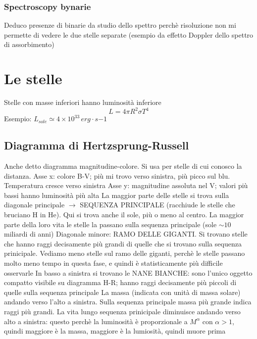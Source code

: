 \documentclass[a4paper,11pt]{report}
\theoremstyle{remark}
\theoremstyle{definition}
\begin{document}
\subsection*{Spectroscopy bynarie}
Deduco presenze di binarie da studio dello spettro perchè risoluzione non mi permette di vedere le due stelle separate (esempio da effetto Doppler dello spettro di assorbimento)

\chapter{Le stelle}
Stelle con masse inferiori hanno luminosità inferiore
\begin{equation*}
    L = 4 \pi R^2 \sigma T^4 
\end{equation*}
Esempio: $L_{sole} \simeq 4 \times 10^33 \, erg \cdot s{-1}$

\section{Diagramma di Hertzsprung-Russell}

Anche detto diagramma magnitudine-colore. Si usa per stelle di cui conosco la distanza. \newline
Asse x: colore B-V; più mi trovo verso sinistra, più picco sul blu. Temperatura cresce verso sinistra \newline
Asse y: magnitudine assoluta nel V; valori più bassi hanno luminosità più alta \newline
La maggior parte delle stelle si trova sulla diagonale principale $\rightarrow$ SEQUENZA PRINCIPALE (racchiude le stelle che bruciano H in He). Qui si trova anche il sole, più o meno al centro. La maggior parte della loro vita le stelle la passano sulla sequenza principale (sole $\sim 10$ miliardi di anni) \newline
Diagonale minore: RAMO DELLE GIGANTI. Si trovano stelle che hanno raggi decisamente più grandi di quelle che si trovano sulla sequenza prinicipale. Vediamo meno stelle sul ramo delle giganti, perchè le stelle passano molto meno tempo in questa fase, e quindi è statisticamente più difficile osservarle \newline
In basso a sinistra si trovano le NANE BIANCHE: sono l'unico oggetto compatto visibile su diagramma H-R; hanno raggi decisamente più piccoli di quelle sulla sequenza principale \newline
La massa (indicata con unità di massa solare) andando verso l'alto a sinistra. Sulla sequenza principale massa più grande indica raggi più grandi. La vita lungo sequenza prinicipale diminuisce andando verso alto a sinistra: questo perchè la luminosità è proporzionale a $M^\alpha$ con $\alpha>1$, quindi maggiore è la massa, maggiore è la lumiosità, quindi muore prima
\end{document}
